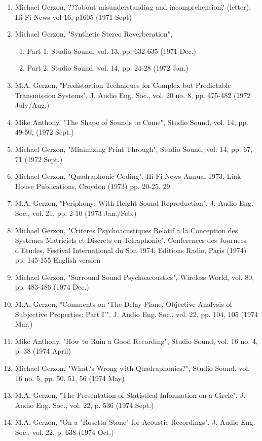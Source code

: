 \documentclass[9pt]{amsart}
\begin{document}
\begin{enumerate}
\begin{enumerate}
	\end{enumerate}
\item Michael Gerzon, ???about misunderstanding and incomprehension? (letter), Hi Fi News vol 16, p1605 (1971 Sept)
\item Michael Gerzon, "Synthetic Stereo Reverberation", 
	\begin{enumerate}
	\item Part 1: Studio Sound, vol. 13, pp. 632-635 (1971 Dec.)
	\item Part 2: Studio Sound, vol. 14, pp. 24-28 (1972 Jan.)
	\end{enumerate}
\item M.A. Gerzon, "Predistortion Techniques for Complex but Predictable Transmission Systems", J. Audio Eng. Soc., vol. 20 no. 8, pp. 475-482 (1972 July/Aug.)
\item Mike Anthony, "The Shape of Sounds to Come", Studio Sound, vol. 14, pp. 49-50, (1972 Sept.)
\item Michael Gerzon, "Minimizing Print Through", Studio Sound, vol. 14, pp. 67, 71 (1972 Sept.)
\item Michael Gerzon, "Quadraphonic Coding", Hi-Fi News Annual 1973, Link House Publications, Croydon (1973) pp. 20-25, 29
\item M.A. Gerzon, "Periphony: With-Height Sound Reproduction", J. Audio Eng. Soc., vol. 21, pp. 2-10 (1973 Jan./Feb.)
\item Michael Gerzon, "Criteres Psychoacustiques Relatif a la Conception des Systemes Matriciels et Discrets en Tetraphonie", Conferences des Journees d'Etudes, Festival International du Son 1974, Editions Radio, Paris (1974) pp. 145-155 English version
\item Michael Gerzon, "Surround Sound Psychoacoustics", Wireless World, vol. 80, pp. 483-486 (1974 Dec.)
\item M.A. Gerzon, "Comments on `The Delay Plane, Objective Analysis of Subjective Properties: Part I'", J. Audio Eng. Soc., vol. 22, pp. 104, 105 (1974 Mar.)
\item Mike Anthony, "How to Ruin a Good Recording", Studio Sound, vol. 16 no. 4, p. 38 (1974 April)
\item Michael Gerzon, "What?s Wrong with Quadraphonics?", Studio Sound, vol. 16 no. 5, pp. 50, 51, 56 (1974 May)
\item M.A. Gerzon, "The Presentation of Statistical Information on a Circle", J. Audio Eng. Soc., vol. 22, p. 536 (1974 Sept.)
\item M.A. Gerzon, "On a "Rosetta Stone" for Acoustic Recordings", J. Audio Eng. Soc., vol. 22, p. 638 (1974 Oct.)

\end{enumerate}
\end{document}
